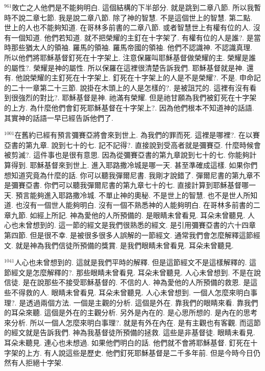 \documentclass{book}
\begin{document}
$^{961}$敗亡之人他們是不能夠明白.
這個結構的下半部分.
就是跳到二章八節.
所以我暫時不說二章七節.
我是說二章八節.
除了神的智慧.
不是這個世上的智慧.
第二點.
世上的人也不能夠知道.
在哥林多前書的二章八節.
或者智慧世上有權有位的人.
沒有一個知道.
他們若知道.
就不把榮耀的主釘在十字架了.
有權有位的人是誰?.
是當時那些猶太人的領袖.
羅馬的領袖.
羅馬帝國的領袖.
他們不認識神.
不認識真理.
所以他們將耶穌基督釘死在十字架上.
注意保羅叫耶穌基督做榮耀的主.
榮耀是誰的屬性?.
榮耀是神的屬性.
所以保羅在這裡很清楚告訴我們.
耶穌基督就是神.
還有.
他說榮耀的主釘死在十字架上.
釘死在十字架上的人是不是榮耀?.
不是.
申命記的二十一章第二十三節.
說掛在木頭上的人是怎樣的?.
是被詛咒的.
這裡有沒有看到很強烈的對比?.
耶穌基督是神.
祂滿有榮耀.
但是祂甘願為我們被釘死在十字架的上方.
為什麼他們會釘死耶穌基督在十字架上?.
因為他們根本不知道神的話語.
其實神的話語一早已經告訴他們了.

$^{1001}$在舊約已經有預言彌賽亞將會來到世上.
為我們的罪而死.
這裡是哪裡?.
在以賽亞書的第九章.
說到七十的七.
記不記得?.
直接說到受高者就是彌賽亞.
什麼時候會被剪滅?.
這件事也是很有意思.
因為從彌賽亞書的第九章說到七十的七.
你能夠計算得到.
耶穌基督來到世上.
進入耶路撒冷城是哪一天.
甚至準確成這樣.
如果你們想知道究竟為什麼的話.
你可以聽我彈爾尼書.
我剛才說錯了.
彈爾尼書的第九章不是彌賽亞書.
你們可以聽我彈爾尼書的第九章七十的七.
直接計算到耶穌基督哪一天.
預言能夠進入耶路撒冷城.
不單止神的奧秘.
不是世上的智慧.
也不是世人所知道.
也沒有一個世人能夠明白.
沒有一個不熟悉神的人能夠明白.
在哥林多前書的二章九節.
如經上所記.
神為愛他的人所預備的.
是眼睛未曾看見.
耳朵未曾聽見.
人心也未曾想到的.
這一節的經文是我們很熟悉的經文.
是引用彌賽亞書的六十四章第四節.
但是很不幸.
是被很多很多人誤解的一節經文.
通常我們會怎麼解釋這節經文.
就是神為我們信徒所預備的獎賞.
是我們眼睛未曾看見.
耳朵未曾聽見.

$^{1041}$人心也未曾想到的.
這就是我們平時的解釋.
但是這節經文不是這樣解釋的.
這節經文是怎麼解釋的?.
那些眼睛未曾看見.
耳朵未曾聽見.
人心未曾想到.
不是在說信徒.
是在說那些不接受耶穌基督的.
不信的人.
神為愛他的人所預備的救恩.
是這些不得救的人.
眼睛未曾看見.
耳朵未曾聽見.
人心未曾想到.
一個人怎麼來明白事理?.
是透過兩個方法.
一個是主觀的分析.
這個是外在.
靠我們的眼睛來看.
靠我們的耳朵來聽.
這個是外在的主觀分析.
另外是內在的.
是心思所想的.
是內在的思考來分析.
所以一個人怎麼來明白事理?.
就是有外在內在.
是有主觀也有客觀.
而這節的經文就是告訴我們.
神為我基督徒所預備的拯救.
這些是非基督徒.
眼睛未看見.
耳朵未聽見.
連心也未想過.
如果他們明白的話.
他們就不會將耶穌基督.
釘死在十字架的上方.
有人說這些是歷史.
他們釘死耶穌基督是二千多年前.
但是今時今日仍然有人拒絕十字架.
\end{document}
